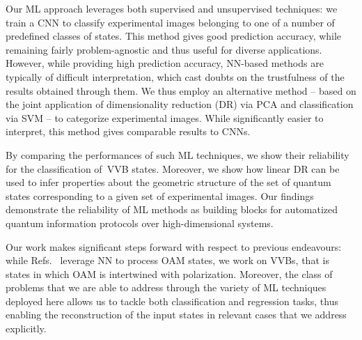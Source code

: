 Our \ac{ML} approach leverages both supervised and unsupervised techniques: we  train a \ac{CNN} to classify experimental images belonging to one of a number of predefined classes of states. This method gives good prediction accuracy, while remaining fairly problem-agnostic and thus useful for diverse applications. However, while providing high prediction accuracy, NN-based methods are typically of difficult interpretation, which cast doubts on the trustfulness of the results obtained through them. We thus employ an alternative method -- based on the joint application of dimensionality reduction (DR) via \ac{PCA} and classification via \ac{SVM} -- to categorize experimental images. While significantly easier to interpret, this method gives comparable results to \acp{CNN}.

By comparing the performances of such \ac{ML} techniques, we show their reliability for the classification of~\ac{VVB} states. Moreover, we show how linear DR can be used to infer properties about the geometric structure of the set of quantum states corresponding to a given set of experimental images.
Our findings demonstrate the reliability of \ac{ML} methods as building blocks for automatized quantum information protocols over high-dimensional systems. 

Our work makes significant steps forward  with respect to previous endeavours: while Refs.~\cite{krenn2014communication,krenn2016twisted,doster2017machine, park2018demultiplexing, lohani2018turbulence, li2018joint} leverage NN to process OAM states, we work on VVBs, that is states in which OAM is intertwined with polarization. Moreover, the class of problems that we are able to address through the variety of ML techniques deployed here allows us to tackle both classification and regression tasks, thus enabling the reconstruction of the input states in relevant cases that we address explicitly.


